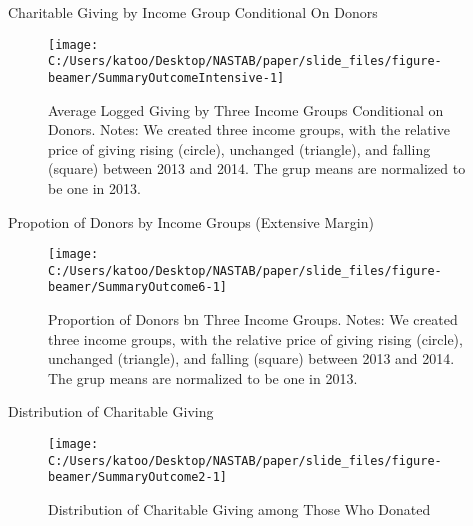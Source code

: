 \documentclass[
  ignorenonframetext,
  aspectratio=169,
]{beamer}
\begin{document}
\begin{frame}{Charitable Giving by Income Group Conditional On Donors}
\protect\hypertarget{charitable-giving-by-income-group-conditional-on-donors}{}
\begin{figure}[t]

{\centering \texttt{[image: C:/Users/katoo/Desktop/NASTAB/paper/slide\_files/figure-beamer/SummaryOutcomeIntensive-1]} 

}

\caption{Average Logged Giving by Three Income Groups Conditional on Donors. Notes: We created three income groups, with the relative price of giving rising (circle), unchanged (triangle), and falling (square) between 2013 and 2014. The grup means are normalized to be one in 2013.}\label{fig:SummaryOutcomeIntensive}
\end{figure}
\end{frame}

\begin{frame}{Propotion of Donors by Income Groups (Extensive Margin)}
\protect\hypertarget{propotion-of-donors-by-income-groups-extensive-margin}{}
\begin{figure}[t]

{\centering \texttt{[image: C:/Users/katoo/Desktop/NASTAB/paper/slide\_files/figure-beamer/SummaryOutcome6-1]} 

}

\caption{Proportion of Donors bn Three Income Groups. Notes: We created three income groups, with the relative price of giving rising (circle), unchanged (triangle), and falling (square) between 2013 and 2014. The grup means are normalized to be one in 2013.}\label{fig:SummaryOutcome6}
\end{figure}
\end{frame}

\begin{frame}{Distribution of Charitable Giving}
\protect\hypertarget{distribution-of-charitable-giving}{}
\begin{figure}[t]

{\centering \texttt{[image: C:/Users/katoo/Desktop/NASTAB/paper/slide\_files/figure-beamer/SummaryOutcome2-1]} 

}

\caption{Distribution of Charitable Giving among Those Who Donated}\label{fig:SummaryOutcome2}
\end{figure}
\end{frame}
\end{document}
